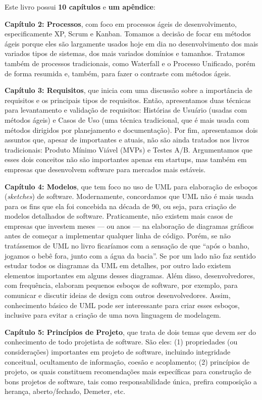 \documentclass[
  11pt,
  twoside]{book}
\begin{document}
Este livro possui \textbf{10 capítulos} e \textbf{um apêndice}:

\textbf{Capítulo 2: Processos}, com foco em processos ágeis de
desenvolvimento, especificamente XP, Scrum e Kanban. Tomamos a decisão
de focar em métodos ágeis porque eles são largamente usados hoje em dia
no desenvolvimento dos mais variados tipos de sistemas, dos mais
variados domínios e tamanhos. Tratamos também de processos tradicionais,
como Waterfall e o Processo Unificado, porém de forma resumida e,
também, para fazer o contraste com métodos ágeis.

\textbf{Capítulo 3: Requisitos}, que inicia com uma discussão sobre a
importância de requisitos e os principais tipos de requisitos. Então,
apresentamos duas técnicas para levantamento e validação de requisitos:
Histórias de Usuário (usadas com métodos ágeis) e Casos de Uso (uma
técnica tradicional, que é mais usada com métodos dirigidos por
planejamento e documentação). Por fim, apresentamos dois assuntos que,
apesar de importantes e atuais, não são ainda tratados nos livros
tradicionais: Produto Mínimo Viável (MVPs) e Testes A/B. Argumentamos
que esses dois conceitos não são importantes apenas em startups, mas
também em empresas que desenvolvem software para mercados mais estáveis.

\textbf{Capítulo 4: Modelos}, que tem foco no uso de UML para elaboração
de esboços (\emph{sketches}) de software. Modernamente, concordamos que
UML não é mais usada para os fins que ela foi concebida na década de 90,
ou seja, para criação de modelos detalhados de software. Praticamente,
não existem mais casos de empresas que investem meses --- ou anos --- na
elaboração de diagramas gráficos antes de começar a implementar qualquer
linha de código. Porém, se não tratássemos de UML no livro ficaríamos
com a sensação de que ``após o banho, jogamos o bebê fora, junto com a
água da bacia''. Se por um lado não faz sentido estudar todos os
diagramas da UML em detalhes, por outro lado existem elementos
importantes em alguns desses diagramas. Além disso, desenvolvedores, com
frequência, elaboram pequenos esboços de software, por exemplo, para
comunicar e discutir ideias de design com outros desenvolvedores. Assim,
conhecimento básico de UML pode ser interessante para criar esses
esboços, inclusive para evitar a criação de uma nova linguagem de
modelagem.

\textbf{Capítulo 5: Princípios de Projeto}, que trata de dois temas que
devem ser do conhecimento de todo projetista de software. São eles: (1)
propriedades (ou considerações) importantes em projeto de software,
incluindo integridade conceitual, ocultamento de informação, coesão e
acoplamento; (2) princípios de projeto, os quais constituem
recomendações mais específicas para construção de bons projetos de
software, tais como responsabilidade única, prefira composição a
herança, aberto/fechado, Demeter, etc.
\end{document}
